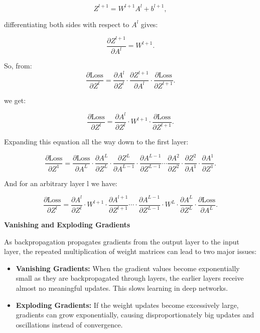 \begin{equation}
Z^{l+1} = W^{l+1} A^l + b^{l+1},
\end{equation}

differentiating both sides with respect to \( A^l \) gives:

\begin{equation}
\frac{\partial Z^{l+1}}{\partial A^l} = W^{l+1}.
\end{equation}

So, from:
\begin{equation}
    \frac{\partial \text{Loss}}{\partial Z^l} =
    \frac{\partial A^l}{\partial Z^l} \cdot \frac{\partial Z^{l+1}}{\partial A^l} \cdot \frac{\partial \text{Loss}}{\partial Z^{l+1}}.
\end{equation}

we get:

\begin{equation}
\frac{\partial \text{Loss}}{\partial Z^l} =
\frac{\partial A^l}{\partial Z^l} \cdot W^{l+1} \cdot \frac{\partial \text{Loss}}{\partial Z^{l+1}}.
\end{equation}


Expanding this equation all the way down to the first layer:

\begin{equation}
\frac{\partial \text{Loss}}{\partial Z^1} =
\frac{\partial \text{Loss}}{\partial A^L}
\cdot
\frac{\partial A^L}{\partial Z^L}
\cdot
\frac{\partial Z^L}{\partial A^{L-1}}
\cdot
\frac{\partial A^{L-1}}{\partial Z^{L-1}}
\cdots
\frac{\partial A^2}{\partial Z^2}
\cdot
\frac{\partial Z^2}{\partial A^1}
\cdot
\frac{\partial A^1}{\partial Z^1}.
\end{equation}

And for an arbitrary layer l we have:

\begin{equation}
\frac{\partial \text{Loss}}{\partial Z^l} =
\frac{\partial A^l}{\partial Z^l}
\cdot
W^{l+1}
\cdot
\frac{\partial A^{l+1}}{\partial Z^{l+1}}
\cdots
\cdot
\frac{\partial A^{L-1}}{\partial Z^{L-1}}
\cdot
W^L
\cdot
\frac{\partial A^L}{\partial Z^L}
\cdot
\frac{\partial \text{Loss}}{\partial A^L}.
\end{equation}

\textbf{Vanishing and Exploding Gradients}  

As backpropagation propagates gradients from the output layer to the input layer, the repeated multiplication of weight matrices can lead to two major issues:  

\begin{itemize}
    \item \textbf{Vanishing Gradients:} When the gradient values become exponentially small as they are backpropagated through layers, the earlier layers receive almost no meaningful updates. This slows learning in deep networks.
    \item \textbf{Exploding Gradients:} If the weight updates become excessively large, gradients can grow exponentially, causing disproportionately big updates and oscillations instead of convergence.
\end{itemize}

